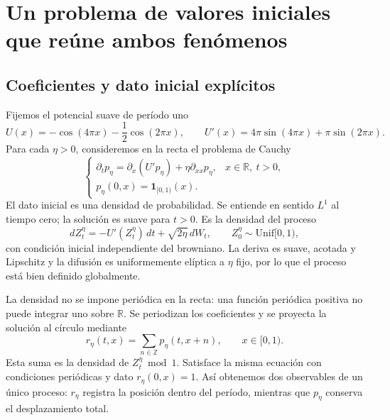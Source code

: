 \documentclass[11pt,a4paper]{article}
\theoremstyle{remark}\newtheorem{remark}{Observación}
\newcommand{\R}{\mathbb R}
\begin{document}
\section{Un problema de valores iniciales que reúne ambos fenómenos}
\subsection{Coeficientes y dato inicial explícitos}
Fijemos el potencial suave de período uno
\begin{equation}\label{eq:explicitU}
 U(x)=-\cos(4\pi x)-\frac12\cos(2\pi x),
 \qquad U'(x)=4\pi\sin(4\pi x)+\pi\sin(2\pi x).
\end{equation}
Para cada $\eta>0$, consideremos en la recta el problema de Cauchy
\begin{equation}\label{eq:IVP}
 \begin{cases}
 \partial_t p_\eta=\partial_x(U'p_\eta)+\eta\partial_{xx}p_\eta,
       & x\in\R,\ t>0,\\
 p_\eta(0,x)=\mathbf 1_{[0,1)}(x).
 \end{cases}
\end{equation}
El dato inicial es una densidad de probabilidad. Se entiende en sentido $L^1$ al tiempo cero; la solución es suave para $t>0$. Es la densidad del proceso
\[
 dZ_t^\eta=-U'(Z_t^\eta)\,dt+\sqrt{2\eta}\,dW_t,
 \qquad Z_0^\eta\sim\mathrm{Unif}[0,1),
\]
con condición inicial independiente del browniano. La deriva es suave, acotada y Lipschitz y la difusión es uniformemente elíptica a $\eta$ fijo, por lo que el proceso está bien definido globalmente.

La densidad no se impone periódica en la recta: una función periódica positiva no puede integrar uno sobre $\R$. Se periodizan los coeficientes y se proyecta la solución al círculo mediante
\begin{equation}\label{eq:periodization}
 r_\eta(t,x)=\sum_{n\in\mathbb Z}p_\eta(t,x+n),\qquad x\in[0,1).
\end{equation}
Esta suma es la densidad de $Z_t^\eta\bmod1$. Satisface la misma ecuación con condiciones periódicas y dato $r_\eta(0,x)=1$. Así obtenemos dos observables de un único proceso: $r_\eta$ registra la posición dentro del período, mientras que $p_\eta$ conserva el desplazamiento total.
\end{document}
